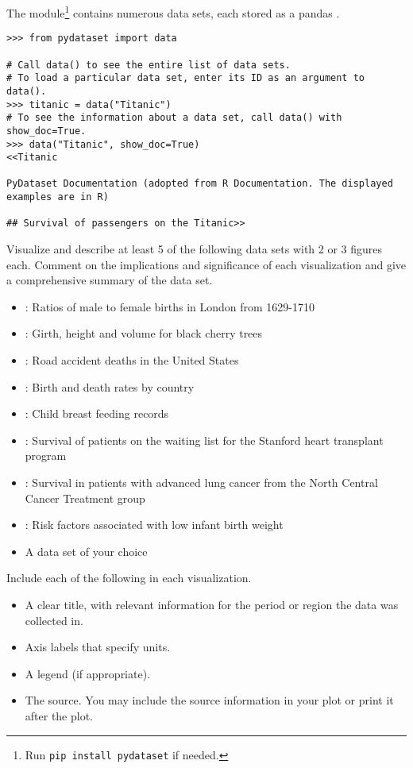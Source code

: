 
The  module\footnote{Run \texttt{pip install pydataset} if needed.} contains numerous data sets, each stored as a pandas .

\begin{lstlisting}
>>> from pydataset import data

# Call data() to see the entire list of data sets.
# To load a particular data set, enter its ID as an argument to data().
>>> titanic = data("Titanic")
# To see the information about a data set, call data() with show_doc=True.
>>> data("Titanic", show_doc=True)
<<Titanic

PyDataset Documentation (adopted from R Documentation. The displayed
examples are in R)

## Survival of passengers on the Titanic>>
\end{lstlisting}

Visualize and describe at least 5 of the following data sets with 2 or 3 figures each.
Comment on the implications and significance of each visualization and give a comprehensive summary of the data set.

\begin{itemize}
\item {}: Ratios of male to female births in London from 1629-1710
\item {}: Girth, height and volume for black cherry trees
\item {}: Road accident deaths in the United States
\item {}: Birth and death rates by country
\item {}: Child breast feeding records
\item {}: Survival of patients on the waiting list for the Stanford heart transplant program
\item {}: Survival in patients with advanced lung cancer from the North Central Cancer Treatment group
\item {}: Risk factors associated with low infant birth weight
\item A data set of your choice
\end{itemize}
Include each of the following in each visualization.
\begin{itemize}
\item A clear title, with relevant information for the period or region the data was collected in.
\item Axis labels that specify units.
\item A legend (if appropriate).
\item The source.
You may include the source information in your plot or print it after the plot.
\end{itemize}
